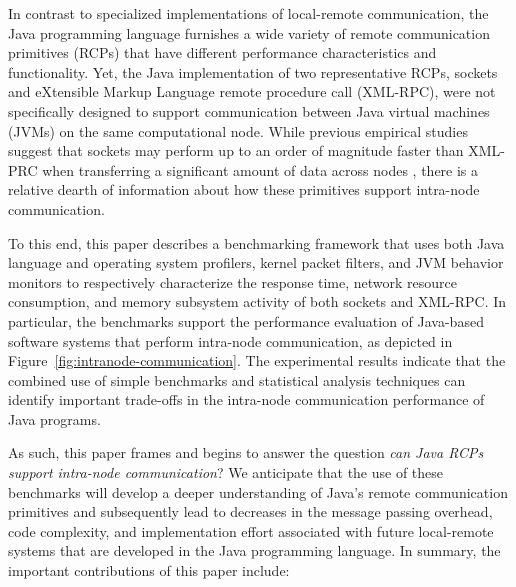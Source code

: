 \documentclass{sig-alternate}
\begin{document}



\begin{sloppypar}
In contrast to specialized implementations of local-remote
communication, the Java programming language furnishes a wide variety
of remote communication primitives (RCPs) that have different
performance characteristics and functionality.  Yet, the Java
implementation of two representative RCPs, sockets and eXtensible
Markup Language remote procedure call (XML-RPC), were not specifically
designed to support communication between Java virtual machines (JVMs)
on the same computational node.  While previous empirical studies
suggest that sockets may perform up to an order of magnitude faster
than XML-PRC when transferring a significant amount of data across
nodes \cite{allman-per}, there is a relative dearth of information
about how these primitives support intra-node communication.
\end{sloppypar}

\begin{sloppypar}
To this end, this paper describes a benchmarking framework that uses
both Java language and operating system profilers, kernel packet
filters, and JVM behavior monitors to respectively characterize the
response time, network resource consumption, and memory subsystem
activity of both sockets and XML-RPC. In particular, the benchmarks
support the performance evaluation of Java-based software systems that
perform intra-node communication, as depicted in
Figure~\ref{fig:intranode-communication}.  The experimental results
indicate that the combined use of simple benchmarks and statistical
analysis techniques can identify important trade-offs in the
intra-node communication performance of Java programs.  

As such, this paper frames and begins to answer the question {\em can
  Java RCPs support intra-node communication}?  We anticipate that the
use of these benchmarks will develop a deeper understanding of Java's
remote communication primitives and subsequently lead to decreases in
the message passing overhead, code complexity, and implementation
effort associated with future local-remote systems that are developed
in the Java programming language.  In summary, the important
contributions of this paper include: \vspace*{-.1in}
\end{sloppypar}
\end{document}
